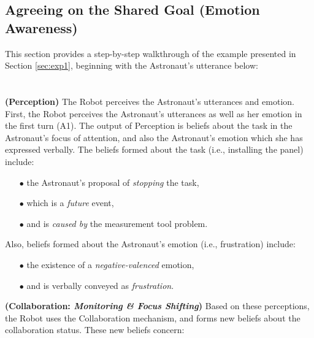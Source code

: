 \subsection{Agreeing on the Shared Goal (Emotion Awareness)}
\label{sec:wt-exp1}

This section provides a step-by-step walkthrough of the example presented in
Section \ref{sec:exp1}, beginning with the Astronaut's utterance below:\\

\noindent{}\\ \\

\noindent \textbf{(Perception)} The Robot perceives the Astronaut's utterances
and emotion.\\
  
First, the Robot perceives the Astronaut's utterances as well as her emotion in
the first turn (A1). The output of Perception is beliefs about the task in the
Astronaut's focus of attention, and also the Astronaut's emotion which she has
expressed verbally. The beliefs formed about the task (i.e., installing the
panel) include:

\begin{itemize}
  \item[$\bullet$] the Astronaut's proposal of \textit{stopping} the task,
  \item[$\bullet$] which is a \textit{future} event,
  \item[$\bullet$] and is \textit{caused by} the measurement tool problem.
\end{itemize}

\noindent Also, beliefs formed about the Astronaut's emotion (i.e., frustration)
include:

\begin{itemize}
  \item[$\bullet$] the existence of a \textit{negative-valenced} emotion,
  \item[$\bullet$] and is verbally conveyed as \textit{frustration}.\\
\end{itemize}

\noindent\textbf{(Collaboration: \textit{Monitoring \& Focus Shifting})}
Based on these perceptions, the Robot uses the Collaboration mechanism, and
forms new beliefs about the collaboration status. These new beliefs concern:

